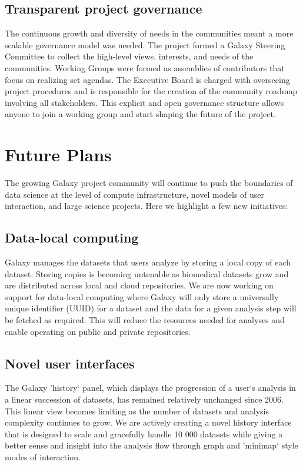 \subsection*{Transparent project governance}
The continuous growth and diversity of needs in the communities meant a more scalable governance model was needed. The project formed a Galaxy Steering Committee to collect the high-level views, interests, and needs of the communities. Working Groups were formed as assemblies of contributors that focus on realizing set agendas. The Executive Board is charged with overseeing project procedures and is responsible for the creation of the community roadmap involving all stakeholders. This explicit and open governance structure allows anyone to join a working group and start shaping the future of the project.

\section*{Future Plans}
The growing Galaxy project community will continue to push the boundaries of data science at the level of compute infrastructure, novel models of user interaction, and large science projects. Here we highlight a few new initiatives:

\subsection*{Data-local computing}
Galaxy manages the datasets that users analyze by storing a local copy of each dataset. Storing copies is becoming untenable as biomedical datasets grow and are distributed across local and cloud repositories. We are now working on support for data-local computing where Galaxy will only store a universally unique identifier (UUID) for a dataset and the data for a given analysis step will be fetched as required. This will reduce the resources needed for analyses and enable operating on public and private repositories.


\subsection*{Novel user interfaces}
The Galaxy 'history` panel, which displays the progression of a user`s analysis in a linear succession of datasets, has remained relatively unchanged since 2006. This linear view becomes limiting as the number of datasets and analysis complexity continues to grow. We are actively creating a novel history interface that is designed to scale and gracefully handle 10 000 datasets while giving a better sense and insight into the analysis flow through graph and 'minimap` style modes of interaction.

